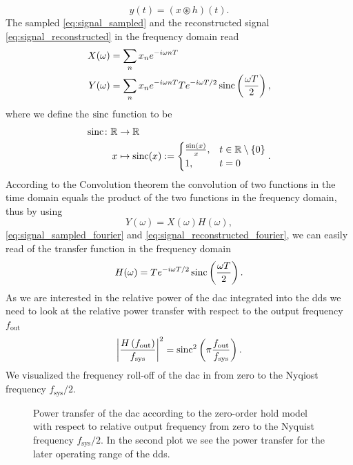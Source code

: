 \begin{equation}
  y(t)
  =
  \left(x\circledast h\right)(t).
  \label{eq:signal_transfer}
\end{equation}
The sampled \cref{eq:signal_sampled} and the reconstructed signal
\cref{eq:signal_reconstructed} in the frequency domain read
\begin{align}
  X(\omega)&=\sum_n x_n e^{-i\omega n T}
  \label{eq:signal_sampled_fourier}\\
  Y(\omega)&=\sum_n x_n e^{-i\omega n T}
  Te^{-i\omega T/2}\operatorname{sinc}\left(\frac{\omega T}{2}\right)
  \label{eq:signal_reconstructed_fourier},
\end{align}
where we define the $\operatorname{sinc}$ function to be
\begin{align}
  \operatorname{sinc}\colon\mathbb{R} &\to \mathbb{R}\\
  x &\mapsto \operatorname{sinc}(x):=
  \begin{cases}
    \frac{\sin(x)}{x}, & t\in\mathbb{R}\setminus\{0\}\\
    1, & t=0
  \end{cases}.
  \label{eq:sinc}
\end{align}
According to the Convolution theorem the convolution of two functions in the
time domain equals the product of the two functions in the frequency domain,
thus by using
\begin{equation}
  Y(\omega)
  =X(\omega)H(\omega),
  \label{eq:transfer_fourier}
\end{equation}
\cref{eq:signal_sampled_fourier} and \cref{eq:signal_reconstructed_fourier},
we can easily read of the transfer function in the frequency domain
\begin{equation}
  H(\omega)
  =Te^{-i\omega T/2}\operatorname{sinc}\left(\frac{\omega T}{2}\right).
\end{equation}
As we are interested in the relative power of the \gls{dac} integrated into
the \gls{dds} we need to look at the relative power transfer with respect to
the output frequency $f_\text{out}$
\begin{equation}
  \abs{\frac{H\left(f_\text{out}\right)}{f_\text{sys}}}^2
  =\operatorname{sinc}^2\left(\pi\frac{f_\text{out}}{f_\text{sys}}\right).
\end{equation}
We visualized the frequency roll-off of the \gls{dac} in
 from zero to the Nyqiost frequency
$f_\text{sys}/2$.
\begin{figure}[htb]
  \centering
  \begin{adjustbox}{width=\textwidth}
    
  \end{adjustbox}
  \caption{Power transfer of the \gls{dac} according to the zero-order hold
    model with respect to relative output frequency from zero to the Nyquist
    frequency $f_\text{sys}/2$. In the second plot we see the power transfer
    for the later operating range of the \gls{dds}.
  }\label{fig:dds_dac_response}
\end{figure}
